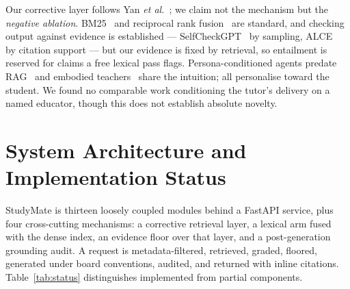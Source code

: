 \documentclass[conference]{IEEEtran}
\begin{document}
Our corrective layer follows Yan \textit{et al.}~\cite{yan2024crag}; we claim
not the mechanism but the \emph{negative ablation}. BM25~\cite{robertson2009}
and reciprocal rank fusion~\cite{cormack2009} are standard, and checking output
against evidence is established --- SelfCheckGPT~\cite{manakul2023} by sampling,
ALCE~\cite{gao2023} by citation support --- but our evidence is fixed by
retrieval, so entailment is reserved for claims a free lexical pass flags.
Persona-conditioned agents predate RAG~\cite{liu2024persona,liu2025pace} and
embodied teachers~\cite{zhao2024} share the intuition; all personalise toward
the student. We found no comparable work conditioning the tutor's delivery on a
named educator, though this does not establish absolute novelty.

\section{System Architecture and Implementation Status}
StudyMate is thirteen loosely coupled modules behind a FastAPI service, plus
four cross-cutting mechanisms: a corrective retrieval layer, a lexical arm fused
with the dense index, an evidence floor over that layer, and a post-generation
grounding audit. A request is metadata-filtered, retrieved, graded, floored,
generated under board conventions, audited, and returned with inline citations.
Table~\ref{tab:status} distinguishes implemented from partial components.
\end{document}
